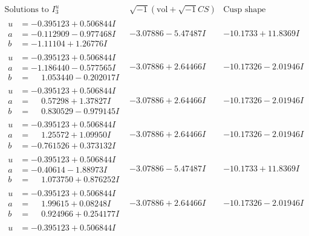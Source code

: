 \documentclass[1p]{elsarticle_modified}
\theoremstyle{definition}
\newcommand{\I}{\sqrt{-1}}
\begin{document}
$$\begin{array}{c|c|c}  
\text{Solutions to }I^u_{3}& \I (\text{vol} + \sqrt{-1}CS) & \text{Cusp shape}\\
 \hline 
\begin{aligned}
u &= -0.395123 + 0.506844 I \\
a &= -0.112909 - 0.977468 I \\
b &= -1.11104 + 1.26776 I\end{aligned}
 & -3.07886 - 5.47487 I & -10.1733 + 11.8369 I \\ \hline\begin{aligned}
u &= -0.395123 + 0.506844 I \\
a &= -1.186440 - 0.577565 I \\
b &= \phantom{-}1.053440 - 0.202017 I\end{aligned}
 & -3.07886 + 2.64466 I & -10.17326 - 2.01946 I \\ \hline\begin{aligned}
u &= -0.395123 + 0.506844 I \\
a &= \phantom{-}0.57298 + 1.37827 I \\
b &= \phantom{-}0.830529 - 0.979145 I\end{aligned}
 & -3.07886 + 2.64466 I & -10.17326 - 2.01946 I \\ \hline\begin{aligned}
u &= -0.395123 + 0.506844 I \\
a &= \phantom{-}1.25572 + 1.09950 I \\
b &= -0.761526 + 0.373132 I\end{aligned}
 & -3.07886 + 2.64466 I & -10.17326 - 2.01946 I \\ \hline\begin{aligned}
u &= -0.395123 + 0.506844 I \\
a &= -0.40614 - 1.88973 I \\
b &= \phantom{-}1.073750 + 0.876252 I\end{aligned}
 & -3.07886 - 5.47487 I & -10.1733 + 11.8369 I \\ \hline\begin{aligned}
u &= -0.395123 + 0.506844 I \\
a &= \phantom{-}1.99615 + 0.08248 I \\
b &= \phantom{-}0.924966 + 0.254177 I\end{aligned}
 & -3.07886 + 2.64466 I & -10.17326 - 2.01946 I \\ \hline\begin{aligned}
u &= -0.395123 + 0.506844 I \\

\end{aligned}
\end{array}$$
\end{document}

